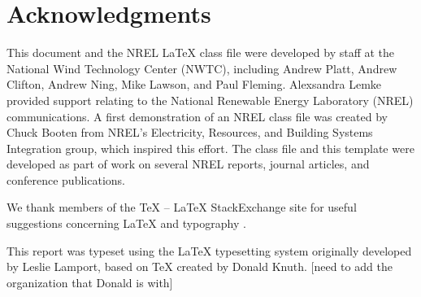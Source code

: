 \chapter*{Acknowledgments}
This document and the NREL LaTeX class file were developed by staff at the National Wind Technology Center (NWTC), including Andrew Platt, Andrew Clifton, Andrew Ning, Mike Lawson, and Paul Fleming. Alexsandra Lemke provided support relating to the National Renewable Energy Laboratory (NREL) communications. A first demonstration of an NREL class file was created by Chuck Booten from NREL's Electricity, Resources, and Building Systems Integration group, which inspired this effort. The class file and this template were developed as part of work on several NREL reports, journal articles, and conference publications. 

We thank members of the TeX -- LaTeX StackExchange site for useful suggestions concerning LaTeX and typography \citep{texstackexchange}.

This report was typeset using the LaTeX typesetting system originally developed by Leslie Lamport, based on TeX created by Donald Knuth. [need to add the organization that Donald is with]
